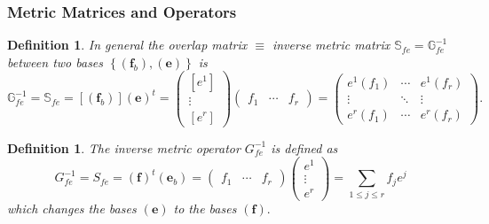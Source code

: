 \documentclass[aps,preprint]{revtex4}
\newtheorem{definition}[theorem]{Definition}
\begin{document}
\subsubsection{Metric Matrices and Operators \label{Metric Matrices and
Operators}}

\begin{definition}
In general the overlap \emph{matrix} $\equiv $ inverse metric matrix $%
\mathbb{S}_{fe}=\mathbb{G}_{fe}^{-1}$ between two bases $\left\{ \left( 
\boldsymbol{f}_{b}\right) ,\left( \boldsymbol{e}\right) \right\} $ is 
\begin{equation}
\mathbb{G}_{fe}^{-1}=\mathbb{S}_{fe}=\left[ \left( \boldsymbol{f}_{b}\right) %
\right] \left( \boldsymbol{e}\right) ^{t}=\left( 
\begin{array}{c}
\left[ e^{1}\right] \\ 
\vdots \\ 
\left[ e^{r}\right]%
\end{array}%
\right) \left( 
\begin{array}{ccc}
f_{1} & \cdots & f_{r}%
\end{array}%
\right) =\left( 
\begin{array}{ccc}
e^{1}\left( f_{1}\right) & \cdots & e^{1}\left( f_{r}\right) \\ 
\vdots & \ddots & \vdots \\ 
e^{r}\left( f_{1}\right) & \cdots & e^{r}\left( f_{r}\right)%
\end{array}%
\right) .
\end{equation}
\end{definition}

\begin{definition}
The inverse metric \emph{operator} $G_{fe}^{-1}$ is defined as 
\begin{equation}
G_{fe}^{-1}=S_{fe}=\left( \boldsymbol{f}\right) ^{t}\left( \boldsymbol{e}%
_{b}\right) =\left( 
\begin{array}{ccc}
f_{1} & \cdots & f_{r}%
\end{array}%
\right) \left( 
\begin{array}{c}
e^{1} \\ 
\vdots \\ 
e^{r}%
\end{array}%
\right) =\sum_{1\leq j\leq r}f_{j}e^{j}
\end{equation}%
which changes the bases $\left( \boldsymbol{e}\right) $ to the bases $\left( 
\boldsymbol{f}\right) .$
\end{definition}
\end{document}
